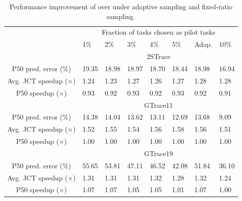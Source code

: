 \begin{table}[tp]
\centering
\caption{Performance improvement of \slearn over \primarybase
  under adaptive sampling and fixed-ratio sampling.
}
\label{table:sim:numPilots:2STrace}
\vspace{-0.25in}
{\small	
		\begin{tabular}{cp{0.18in}p{0.18in}p{0.18in}p{0.18in}p{0.18in}p{0.18in}p{0.18in}}\\
\hline
			 & \multicolumn{7}{c}{Fraction of tasks chosen as pilot tasks }\\
			&1\%&2\%&3\%&4\%&5\%&Adap.&10\%\\
\hline
		& \multicolumn{7}{c}{2STrace}\\
\hline
			P50 pred. error (\%) \hspace{-0.1in}&19.35&18.98&18.97&18.70&18.44&18.98&16.94\\
			Avg. JCT speedup ($\times$)\hspace{-0.1in}&1.24&1.23&1.27&1.26&1.27&1.28&1.28\\
			P50 speedup ($\times$)\hspace{-0.1in}&0.93&0.92&0.93&0.92&0.93&0.92&0.91\\
\hline
		& \multicolumn{7}{c}{GTrace11}\\
\hline
			P50 pred. error (\%)\hspace{-0.1in}&14.38&14.04&13.62&13.11&12.69&13.68&9.09\\
			Avg. JCT speedup ($\times$)\hspace{-0.1in}&1.52&1.55&1.54&1.56&1.58&1.56&1.51\\
			P50 speedup ($\times$)\hspace{-0.1in}&1.00&1.00&1.00&1.00&1.00&1.00&1.00\\
\hline
		& \multicolumn{7}{c}{GTrace19}\\
\hline
			P50 pred. error (\%)\hspace{-0.1in}&55.65&53.81&47.11&46.52&42.08&51.84&36.10\\
			Avg. JCT speedup ($\times$)\hspace{-0.1in}&1.31&1.31&1.31&1.32&1.28&1.32&1.24\\
			P50 speedup ($\times$)\hspace{-0.1in}&1.07&1.07&1.05&1.05&1.01&1.07&1.00\\
\hline
	\end{tabular}
}
\vspace{-0.1in}
\end{table}

